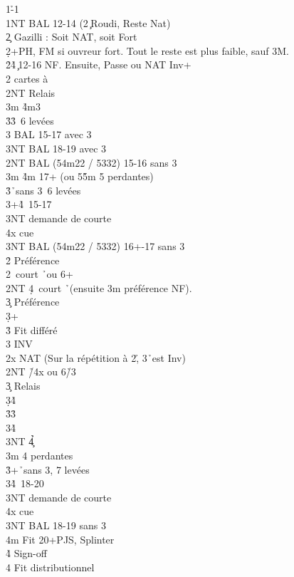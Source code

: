 \documentclass[a4paper]{article}
\begin{document}
\begin{bidtable}
1\h-1\s\\
1NT \> BAL 12-14 (2\c\ Roudi, Reste Nat)\\
2\c \> Gazilli : Soit NAT, soit Fort\+\\
2\d {}+PH, FM si ouvreur fort. Tout le reste est plus faible, sauf 3M.\+\\
2\h {}\h 4\c\ 12-16 NF. Ensuite, Passe ou NAT Inv+\\
2\s {} cartes à \s \+\\
2NT \> Relais\+\\
3m \h 4m3\s \\
3\h {}\h 3\s\ 6 levées\\
3\s \> BAL 15-17 avec 3\s \\
3NT \> BAL 18-19 avec 3\s \-\-\\
2NT \> BAL (54m22 / 5332) 15-16 sans 3\s \\
3m \h 4m 17+ (ou 5\h 5m 5 perdantes)\\
3\h {}\h\ sans 3\s\ 6 levées\\
3\s {}+\h 4\s\ 15-17\+\\
3NT \> demande de courte\\
4x \> cue\-\\
3NT \> BAL (54m22 / 5332) 16+-17 sans 3\s \-\\
2\h \> Préférence\\
2\s {}\s\ court \h\ ou 6+\s \\
2NT \d 4\s\ court \h\ (ensuite 3m préférence NF).\\
3\c \> Préférence\\
3\d {}+\d \\
3\h \> Fit différé\\
3\s \> INV\-\\
2x \> NAT (Sur la répétition à 2\h , 3\h\ est Inv)\\
2NT \h /4x ou 6\h /3\s \+\\
3\c \> Relais\+\\
3\d {}\h 4\d \\
3\h {}\h 3\s \\
3\s {}\h 4\s \\
3NT \h 4\c \-\-\\
3m  4 perdantes\\
3\h {}+\h\ sans 3\s , 7 levées\\
3\s {}\h 4\s\ 18-20\+\\
3NT \> demande de courte\\
4x \> cue\-\\
3NT \> BAL 18-19 sans 3\s \\
4m \> Fit 20+PJS, Splinter\\
4\h \> Sign-off\\
4\s \> Fit distributionnel
\end{bidtable}
\end{document}
